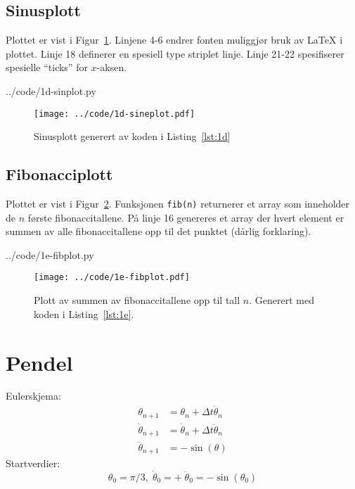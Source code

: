 \clearpage
\subsection{Sinusplott} %
\label{sub:sinusplott}
Plottet er vist i Figur~\ref{fig:1d}. Linjene 4-6 endrer fonten muliggjør bruk av LaTeX i plottet. Linje 18 definerer en spesiell type striplet linje. Linje 21-22 spesifiserer spesielle ``ticks'' for $x$-aksen.

  {../code/1d-sinplot.py}

\begin{figure}[htbp]
  \centering
  \texttt{[image: ../code/1d-sineplot.pdf]}
  \caption{Sinusplott generert av koden i Listing~\ref{lst:1d}}
  \label{fig:1d}
\end{figure}



\clearpage
\subsection{Fibonacciplott} %
\label{sub:fibonacciplott}
Plottet er vist i Figur~\ref{fig:1e}. Funksjonen \texttt{fib(n)} returnerer et array som inneholder de $n$ første fibonaccitallene. På linje 16 genereres et array der hvert element er summen av alle fibonaccitallene opp til det punktet (dårlig forklaring).

  {../code/1e-fibplot.py}

\begin{figure}[htbp]
  \centering
  \texttt{[image: ../code/1e-fibplot.pdf]}
  \caption{Plott av summen av fibonaccitallene opp til tall $n$. Generert med koden i Listing~\ref{lst:1e}.}
  \label{fig:1e}
\end{figure}




\clearpage
\section{Pendel} %
\label{sec:pendel}
Eulerskjema:
\begin{subequations}
\begin{align}
  \theta_{n+1}      &= \theta_n  + \Delta t \dot\theta_n \\
  \dot\theta_{n+1}  &= \dot\theta_n + \Delta t \ddot\theta_n \\
  \ddot\theta_{n+1} &= - \sin(\theta)
\end{align}
\end{subequations}
Startverdier:
\begin{equation}
  \nonumber
  \theta_0 = \pi/3, \; \dot\theta_0 = + \; \ddot\theta_0 = -\sin(\theta_0)
\end{equation}


